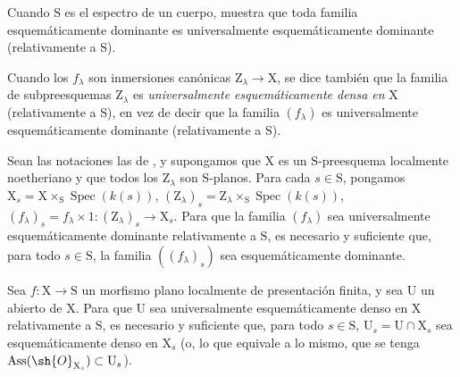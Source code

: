 Cuando $\mathrm{S}$ es el espectro de un cuerpo,  muestra que toda familia esquemáticamente dominante es universalmente esquemáticamente dominante (relativamente a $\mathrm{S}$).

Cuando los $f_\lambda$ son inmersiones canónicas $\mathrm{Z}_\lambda\to\mathrm{X}$, se dice también que la familia de subpreesquemas $\mathrm{Z}_\lambda$ es \emph{universalmente esquemáticamente densa en} $\mathrm{X}$ (relativamente a $\mathrm{S}$), en vez de decir que la familia $(f_\lambda)$ es universalmente esquemáticamente dominante (relativamente a $\mathrm{S}$).

\begin{theorem}[11.10.9]
\label{IV.11.10.9}
Sean las notaciones las de , y supongamos que $\mathrm{X}$ es un $\mathrm{S}$-preesquema localmente noetheriano y que todos los $\mathrm{Z}_\lambda$ son $\mathrm{S}$-planos.
Para cada $s\in\mathrm{S}$, pongamos $\mathrm{X}_s=\mathrm{X}\times_\mathrm{S}\operatorname{Spec}(k(s))$, $(\mathrm{Z}_\lambda)_s=\mathrm{Z}_\lambda\times_\mathrm{S}\operatorname{Spec}(k(s))$, $(f_\lambda)_s=f_\lambda\times 1:(\mathrm{Z}_\lambda)_s\to\mathrm{X}_s$.
Para que la familia $(f_\lambda)$ sea universalmente esquemáticamente dominante relativamente a $\mathrm{S}$, es necesario y suficiente que, para todo $s\in\mathrm{S}$, la familia $((f_\lambda)_s)$ sea esquemáticamente dominante.
\end{theorem}

\begin{proposition}[11.10.10]
\label{IV.11.10.10}
Sea $f:\mathrm{X}\to\mathrm{S}$ un morfismo plano localmente de presentación finita, y sea $\mathrm{U}$ un abierto de $\mathrm{X}$.
Para que $\mathrm{U}$ sea universalmente esquemáticamente denso en $\mathrm{X}$ relativamente a $\mathrm{S}$, es necesario y suficiente que, para todo $s\in\mathrm{S}$, $\mathrm{U}_s=\mathrm{U}\cap\mathrm{X}_s$ sea esquemáticamente denso en $\mathrm{X}_s$ (o, lo que equivale a lo mismo, que se tenga $\operatorname{Ass}(\sh{O}_{\mathrm{X}_s})\subset\mathrm{U}_s$).
\end{proposition}
